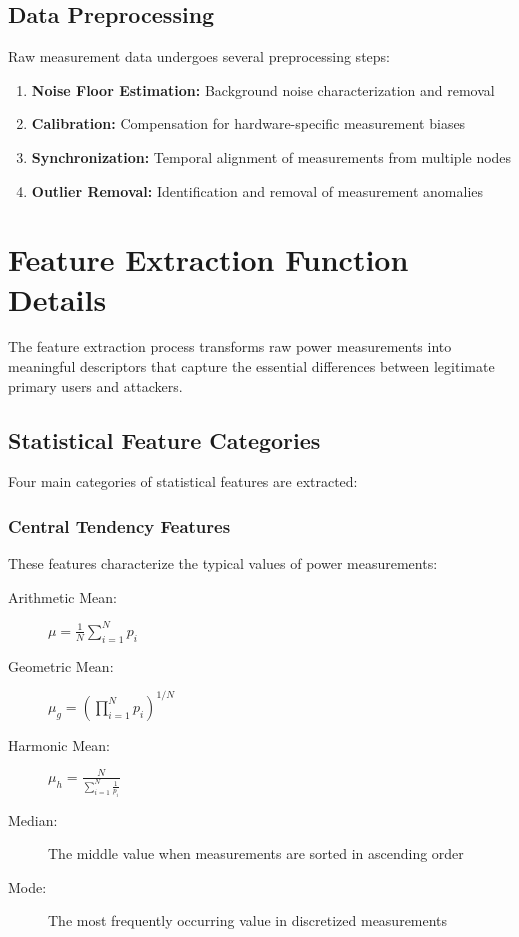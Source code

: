 \subsection{Data Preprocessing}
Raw measurement data undergoes several preprocessing steps:

\begin{enumerate}
\item \textbf{Noise Floor Estimation:} Background noise characterization and removal
\item \textbf{Calibration:} Compensation for hardware-specific measurement biases
\item \textbf{Synchronization:} Temporal alignment of measurements from multiple nodes
\item \textbf{Outlier Removal:} Identification and removal of measurement anomalies
\end{enumerate}

\section{Feature Extraction Function Details}
The feature extraction process transforms raw power measurements into meaningful descriptors that capture the essential differences between legitimate primary users and attackers.

\subsection{Statistical Feature Categories}
Four main categories of statistical features are extracted:

\subsubsection{Central Tendency Features}
These features characterize the typical values of power measurements:

\begin{description}
\item[Arithmetic Mean:] $\mu = \frac{1}{N} \sum_{i=1}^{N} p_i$
\item[Geometric Mean:] $\mu_g = \left(\prod_{i=1}^{N} p_i\right)^{1/N}$
\item[Harmonic Mean:] $\mu_h = \frac{N}{\sum_{i=1}^{N} \frac{1}{p_i}}$
\item[Median:] The middle value when measurements are sorted in ascending order
\item[Mode:] The most frequently occurring value in discretized measurements
\end{description}

